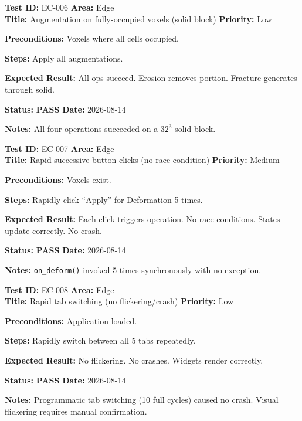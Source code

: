 \documentclass[12pt,a4paper]{article}
\newcommand{\pass}{\textcolor{paleogreen}{\textbf{PASS}}}
\newcommand{\testheader}[4]{%
  \smallskip
  \noindent\textbf{Test ID:} #1 \hfill \textbf{Area:} #2 \\
  \textbf{Title:} #3 \hfill \textbf{Priority:} #4
}
\newenvironment{testbody}{%
  \begin{description}[leftmargin=2em,style=nextline]
}{%
  \end{description}
  \smallskip
}
\begin{document}
\testheader{EC-006}{Edge}{Augmentation on fully-occupied voxels (solid block)}{Low}
\begin{testbody}
  \item[\textbf{Preconditions:}] Voxels where all cells occupied.
  \item[\textbf{Steps:}] Apply all augmentations.
  \item[\textbf{Expected Result:}] All ops succeed. Erosion removes portion.
        Fracture generates through solid.
  \item[\textbf{Status:}] \pass{} \hspace{1em} \textbf{Date:} 2026-08-14
  \item[\textbf{Notes:}] All four operations succeeded on a $32^3$ solid block.
\end{testbody}

\testheader{EC-007}{Edge}{Rapid successive button clicks (no race condition)}{Medium}
\begin{testbody}
  \item[\textbf{Preconditions:}] Voxels exist.
  \item[\textbf{Steps:}] Rapidly click ``Apply'' for Deformation 5 times.
  \item[\textbf{Expected Result:}] Each click triggers operation. No race
        conditions. States update correctly. No crash.
  \item[\textbf{Status:}] \pass{} \hspace{1em} \textbf{Date:} 2026-08-14
  \item[\textbf{Notes:}] \texttt{on\_deform()} invoked 5 times synchronously
        with no exception.
\end{testbody}

\testheader{EC-008}{Edge}{Rapid tab switching (no flickering/crash)}{Low}
\begin{testbody}
  \item[\textbf{Preconditions:}] Application loaded.
  \item[\textbf{Steps:}] Rapidly switch between all 5 tabs repeatedly.
  \item[\textbf{Expected Result:}] No flickering. No crashes. Widgets render
        correctly.
  \item[\textbf{Status:}] \pass{} \hspace{1em} \textbf{Date:} 2026-08-14
  \item[\textbf{Notes:}] Programmatic tab switching (10 full cycles) caused no
        crash. Visual flickering requires manual confirmation.
\end{testbody}
\end{document}
